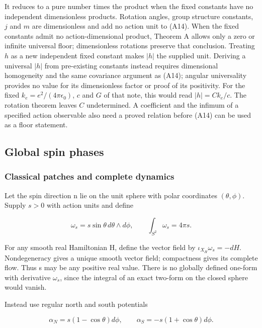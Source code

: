 \documentclass[11pt,a4paper]{article}
\begin{document}
It reduces to a pure number times the product when the fixed constants
have no independent dimensionless products. Rotation angles, group
structure constants, \(j\) and \(m\) are dimensionless and add no action
unit to (A14). When the fixed constants admit no action-dimensional
product, Theorem A allows only a zero or infinite universal floor;
dimensionless rotations preserve that conclusion. Treating \(h\) as a
new independent fixed constant makes \(|h|\) the supplied unit. Deriving
a universal \(|h|\) from pre-existing constants instead requires
dimensional homogeneity and the same covariance argument as (A14);
angular universality provides no value for its dimensionless factor or
proof of its positivity. For the fixed \(k_e=e^2/(4\pi\epsilon_0)\),
\(c\) and \(G\) of that note, this would read \(|h|=Ck_e/c\). The
rotation theorem leaves \(C\) undetermined. A coefficient and the
infimum of a specified action observable also need a proved relation
before (A14) can be used as a floor statement.

\hypertarget{global-spin-phases}{%
\subsection{Global spin phases}\label{global-spin-phases}}

\hypertarget{classical-patches-and-complete-dynamics}{%
\subsubsection{Classical patches and complete
dynamics}\label{classical-patches-and-complete-dynamics}}

Let the spin direction n lie on the unit sphere with polar coordinates
\((\theta,\phi)\). Supply \(s>0\) with action units and define

\[\omega_s=s\sin\theta\,d\theta\wedge d\phi,
\qquad \int_{S^2}\omega_s=4\pi s. \tag{P1}\]

For any smooth real Hamiltonian H, define the vector field by
\(\iota_{X_H}\omega_s=-dH\). Nondegeneracy gives a unique smooth vector
field; compactness gives its complete flow. Thus s may be any positive
real value. There is no globally defined one-form with derivative
\(\omega_s\), since the integral of an exact two-form on the closed
sphere would vanish.

Instead use regular north and south potentials

\[\alpha_N=s(1-\cos\theta)d\phi,\qquad
\alpha_S=-s(1+\cos\theta)d\phi. \tag{P2}\]
\end{document}

